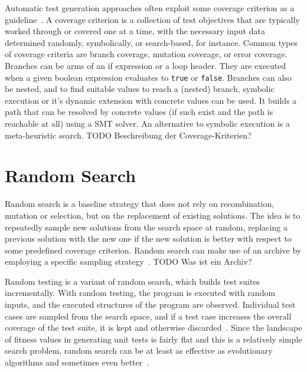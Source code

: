 \documentclass[paper=a4,%
  twoside,%
  BCOR4mm,%
  abstract=true,%
  toc=bibliography,%
  chapterprefix=true,%
  toc=bibliographynumbered,%
  open=right,%
  english,%
  pagesize=pdftex]{scrreprt}
\begin{document}

Automatic test generation approaches often exploit some coverage criterion as a guideline~\cite{Fraser_2011a}. A coverage criterion is a collection of test objectives that are typically worked through or covered one at a time, with the necessary input data determined randomly, symbolically, or search-based, for instance. Common types of coverage criteria are branch coverage, mutation coverage, or error coverage. Branches can be arms of an if expression or a loop header. They are executed when a given boolean expression evaluates to \lstinline{true} or \lstinline{false}. Branches can also be nested, and to find suitable values to reach a (nested) branch, symbolic execution or it's dynamic extension with concrete values can be used. It builds a path that can be resolved by concrete values (if such exist and the path is reachable at all) using a \ac{SMT} solver. An alternative to symbolic execution is a meta-heuristic search. TODO Beschreibung der Coverage-Kriterien?


\section{Random Search}
Random search is a baseline strategy that does not rely on recombination, mutation or selection, but on the replacement of existing solutions. The idea is to repeatedly sample new solutions from the search space at random, replacing a previous solution with the new one if the new solution is better with respect to some predefined coverage criterion. Random search can make use of an archive by employing a specific sampling strategy~\cite{Campos2017}. TODO Was ist ein Archiv?

Random testing is a variant of random search, which builds test suites incrementally. With random testing, the program is executed with random inputs, and the executed structures of the program are observed. Individual test cases are sampled from the search space, and if a test case increases the overall coverage of the test suite, it is kept and otherwise discarded~\cite{Campos2017}. Since the landscape of fitness values in generating unit tests is fairly flat and this is a relatively simple search problem, random search can be at least as effective as evolutionary algorithms and sometimes even better~\cite{Shamshiri2015a}.
\end{document}
